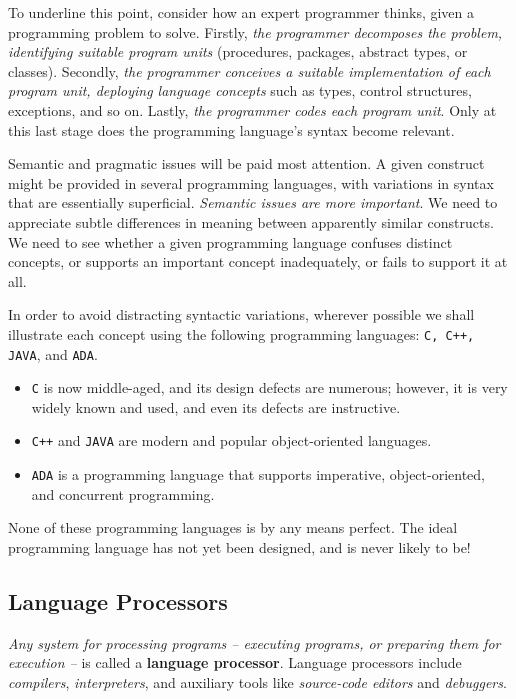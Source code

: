 \documentclass{article}
\begin{document}
To underline this point, consider how an expert programmer thinks, given a
programming problem to solve. Firstly, \textit{the programmer decomposes the problem, identifying suitable program units} (procedures, packages, abstract types, or classes). Secondly, \textit{the programmer conceives a suitable implementation of each program unit, deploying language concepts} such as types, control structures, exceptions, and so on. Lastly, \textit{the programmer codes each program unit}. Only at this last stage does the programming language’s syntax become relevant.

Semantic and pragmatic issues will be paid most attention. A given construct might be provided in several programming languages, with variations in syntax that are essentially superficial. \textit{Semantic issues are more important}. We need to appreciate subtle differences in meaning between apparently similar constructs. We need to see whether a given programming language confuses distinct concepts, or supports an important concept inadequately, or fails to support it at all.

In order to avoid distracting syntactic variations, wherever possible we shall illustrate each concept using the following programming languages: \texttt{C, C++, JAVA}, and \texttt{ADA}. 
\begin{itemize}
    \item \texttt{C} is now middle-aged, and its design defects are numerous; however, it is very widely known and used, and even its defects are instructive. 
    \item \texttt{C++} and \texttt{JAVA} are modern and popular object-oriented languages. 
    \item \texttt{ADA} is a programming language that supports imperative, object-oriented, and concurrent programming. 
\end{itemize}
None of these programming languages is by any means perfect. The ideal programming language has not yet been designed, and is never likely to be!

\subsection{Language Processors}

\textit{Any system for processing programs – executing programs, or preparing them for execution –} is called a \textbf{language processor}. Language processors include \textit{compilers}, \textit{interpreters}, and auxiliary tools like \textit{source-code editors} and \textit{debuggers}.
\end{document}
